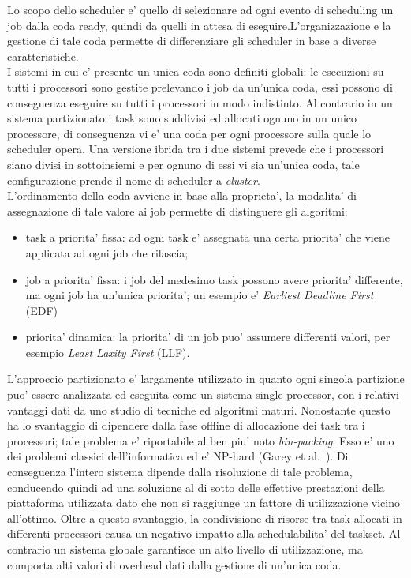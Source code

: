 Lo scopo dello scheduler e' quello di selezionare ad ogni evento di scheduling un job dalla coda ready, quindi da quelli in attesa di eseguire.L'organizzazione e la gestione di tale coda permette di differenziare gli scheduler in base a diverse caratteristiche.\\

I sistemi in cui e' presente un unica coda sono definiti globali: le esecuzioni su tutti i processori sono gestite prelevando i job da un'unica coda, essi possono di conseguenza eseguire su tutti i processori in modo indistinto. Al contrario in un sistema partizionato i task sono suddivisi ed allocati ognuno in un unico processore, di conseguenza vi e' una coda per ogni processore sulla quale lo scheduler opera. Una versione ibrida tra i due sistemi prevede che i processori siano divisi in sottoinsiemi e per ognuno di essi vi sia un'unica coda, tale configurazione prende il nome di scheduler a \textit{cluster}.\\

L'ordinamento della coda avviene in base alla proprieta', la modalita' di assegnazione di tale valore ai job permette di distinguere gli algoritmi:

\begin{itemize}
	\item task a priorita' fissa: ad ogni task e' assegnata una certa priorita' che viene applicata ad ogni job che rilascia;
	\item job a priorita' fissa: i job del medesimo task possono avere priorita' differente, ma ogni job ha un'unica priorita'; un esempio e' \textit{Earliest Deadline First} (EDF)
	\item priorita' dinamica: la priorita' di un job puo' assumere differenti valori, per esempio \textit{Least Laxity First} (LLF).
\end{itemize}

L'approccio partizionato e' largamente utilizzato in quanto ogni singola partizione puo' essere analizzata ed eseguita come un sistema single processor, con i relativi vantaggi dati da uno studio di tecniche ed algoritmi maturi. Nonostante questo ha lo svantaggio di dipendere dalla fase offline di allocazione dei task tra i processori; tale problema e' riportabile al ben piu' noto \textit{bin-packing}. Esso e' uno dei problemi classici dell'informatica ed e' NP-hard (Garey et al.~\cite{Garey:1979:CIG:578533}). Di conseguenza l'intero sistema dipende dalla risoluzione di tale problema, conducendo quindi ad una soluzione al di sotto delle effettive prestazioni della piattaforma utilizzata dato che non si raggiunge un fattore di utilizzazione vicino all'ottimo. Oltre a questo svantaggio, la condivisione di risorse tra task allocati in differenti processori causa un negativo impatto alla schedulabilita' del taskset. Al contrario un sistema globale garantisce un alto livello di utilizzazione, ma comporta alti valori di overhead dati dalla gestione di un'unica coda.\\

